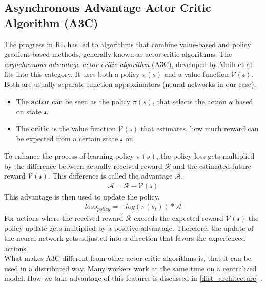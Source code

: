 \subsection*{Asynchronous Advantage Actor Critic Algorithm (A3C)}\label{a3c_intro}
The progress in RL has led to algorithms that combine value-based and policy gradient-based methods, generally known as actor-critic algorithms. The \textit{asynchronous advantage actor critic algorithm} (A3C), developed by Mnih et al. \cite{a3c} fits into this category. It uses both a policy $\pi(s)$ and a value function $\mathcal{V(s)}$.
Both are usually separate function approximators (neural networks in our case).
\begin{itemize}
	\item The \textbf{actor} can be seen as the policy $\pi(s)$, that selects the action $\mathcal{u}$ based on state $\mathcal{s}$.
	\item The \textbf{critic} is the value function $\mathcal{V(s)}$ that estimates, how much reward can be expected from a certain state  $\mathcal{s}$ on.
\end{itemize}
To enhance the process of learning policy $\pi(s)$, the policy loss gets multiplied by the difference between actually received reward $\mathcal{R}$ and the estimated future reward $\mathcal{V(s)}$. This difference is called the advantage $\mathcal{A}$.
\begin{gather*}
\mathcal{A}=\mathcal{R}-\mathcal{V(s)}
\end{gather*}
This advantage is then used to update the policy.
\begin{gather*}
loss_{policy}=-log(\pi(s_{t}))*\mathcal{A}
\end{gather*}
For actions where the received reward $\mathcal{R}$ exceeds the expected reward $\mathcal{V(s)}$ the policy update gets multiplied by a positive advantage. Therefore, the update of the neural network gets adjusted into a direction that favors the experienced actions.\\
What makes A3C different from other actor-critic algorithms is, that it can be used in a distributed way. Many workers work at the same time on a centralized model. How we take advantage of this features is discussed in
\ref{dist_architecture} .

